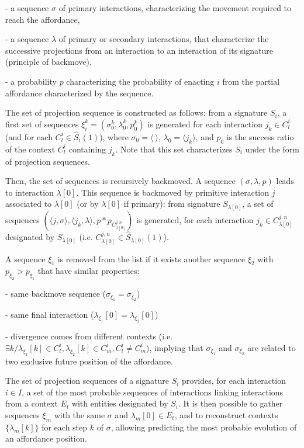 \documentclass[conference]{IEEEtran}
\begin{document}
- a sequence $\sigma$ of primary interactions, characterizing the movement required to reach the affordance,

- a sequence $\lambda$ of primary or secondary interactions, that characterize the successive projections from an interaction to an interaction of its signature (principle of backmove).

- a probability $p$ characterizing the probability of enacting $i$ from the partial affordance characterized by the sequence.


The set of projection sequence is constructed as follows: from a signature $S_i$, a first set of sequences $\xi_i^k = (\sigma_0^k, \lambda_0^k, p_0^k)$ is generated for each interaction $j_k \in C_l^i$ (and for each $C_l^i \in \hat{S}_i(1)$), %
where $\sigma_0=\langle\: \rangle$, $\lambda_0=\langle j_k\rangle$,
and $p_0$ is the success ratio of the context $C_l^i$ containing $j_k$. Note that this set characterizes $S_i$ under the form of projection sequences.

Then, the set of sequences is recursively backmoved. A sequence $(\sigma, \lambda, p)$ leads to interaction $\lambda[0]$. This sequence is backmoved by primitive interaction $j$ associated to $\lambda[0]$ (or by $\lambda[0]$ if primary): from signature $S_{\lambda[0]}$, a set of sequences $(\langle j,\sigma \rangle, \langle j_k,\lambda \rangle, p*p_{C_{\lambda[0]}^{j,n}})$ is generated, for each interaction {\small $j_k \in C_{\lambda[0]}^{j,n}$} designated by $S_{\lambda[0]}$ (i.e. {\small $C_{\lambda[0]}^{j,n} \in \hat{S}_{\lambda[0]}(1)$}).

A sequence $\xi_1$ is removed from the list if it exists another sequence $\xi_2$ with $p_{\xi_2}>p_{\xi_1}$ that have similar properties:

- same backmove sequence ($\sigma_{\xi_1}=\sigma_{\xi_2}$)

- same final interaction ($\lambda_{\xi_1}[0]=\lambda_{\xi_2}[0]$)

- divergence comes from different contexts (i.e. $\exists k / \lambda_{\xi_1}[k] \in C_l^i, \lambda_{\xi_2}[k] \in C_m^i, C_l^i \neq C_m^i$), implying that $\sigma_{\xi_1}$ and $\sigma_{\xi_2}$  are related to two exclusive future position of the affordance. %

The set of projection sequences of a signature $S_i$ provides, for each interaction $i \in I$, a set of the most probable sequences of interactions linking interactions from a context $E_t$ with entities designated by $S_i$.
It is then possible to gather sequences $\xi_m$ with the same $\sigma$ and $\lambda_m[0]\in E_t$, and to reconstruct contexts $\{\lambda_m[k]\}$ for each step $k$ of $\sigma$, allowing  predicting the most probable evolution of an affordance position.
\end{document}
